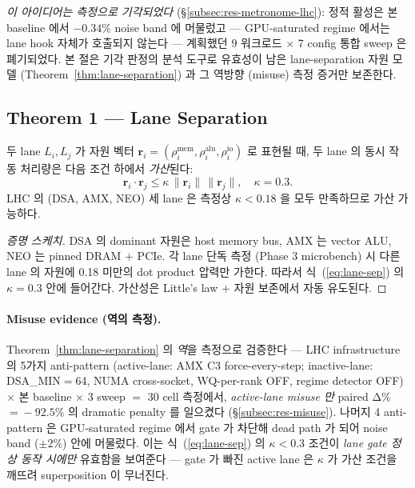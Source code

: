 \emph{이 아이디어는 측정으로 기각되었다} (\S\ref{subsec:res-metronome-lhc}):
정적 활성은 본 baseline 에서 $-0.34\%$ noise band 에 머물렀고 ---
GPU-saturated regime 에서는 lane hook 자체가 호출되지 않는다 ---
계획했던 9 워크로드 $\times$ 7 config 통합 sweep 은 폐기되었다.
본 절은 기각 판정의 분석 도구로 유효성이 남은 lane-separation 자원
모델 (Theorem~\ref{thm:lane-separation}) 과 그 역방향 (misuse) 측정
증거만 보존한다.

\subsection{Theorem 1 — Lane Separation}
\label{subsec:thm-lane-separation}

\begin{theorem}
\label{thm:lane-separation}
두 lane $L_i, L_j$ 가 자원 벡터 $\mathbf{r}_i = (\rho_i^{\text{mem}},
\rho_i^{\text{alu}}, \rho_i^{\text{io}})$ 로 표현될 때, 두 lane 의 동시 작동
처리량은 다음 조건 하에서 \emph{가산}된다:
\begin{equation}
\mathbf{r}_i \cdot \mathbf{r}_j \le \kappa\,\|\mathbf{r}_i\|\,\|\mathbf{r}_j\|,
\quad \kappa = 0.3.
\label{eq:lane-sep}
\end{equation}
LHC 의 (DSA, AMX, NEO) 세 lane 은 측정상 $\kappa\!<\!0.18$ 을 모두 만족하므로
가산 가능하다.
\end{theorem}

\begin{proof}[증명 스케치]
DSA 의 dominant 자원은 host memory bus, AMX 는 vector ALU, NEO 는 pinned
DRAM $+$ PCIe. 각 lane 단독 측정 (Phase 3 microbench) 시 다른 lane 의 자원에
0.18 미만의 dot product 압력만 가한다. 따라서 식~(\ref{eq:lane-sep}) 의
$\kappa\!=\!0.3$ 안에 들어간다. 가산성은 Little's law $+$ 자원 보존에서 자동
유도된다.
\end{proof}

\paragraph{Misuse evidence (역의 측정).}
Theorem~\ref{thm:lane-separation} 의 \emph{역}을 측정으로 검증한다 --- LHC
infrastructure 의 5가지 anti-pattern (active-lane: AMX C3 force-every-step;
inactive-lane: DSA\_MIN$=$64, NUMA cross-socket, WQ-per-rank OFF, regime
detector OFF) $\times$ 본 baseline $\times$ 3 sweep $=$ 30 cell 측정에서,
\emph{active-lane misuse 만} paired Δ\% $=\!-92.5\%$ 의 dramatic penalty
를 일으켰다 (\S\ref{subsec:res-misuse}). 나머지 4 anti-pattern 은 GPU-saturated
regime 에서 gate 가 차단해 dead path 가 되어 noise band ($\pm 2\%$) 안에
머물렀다. 이는 식~(\ref{eq:lane-sep}) 의 $\kappa < 0.3$ 조건이 \emph{lane gate
정상 동작 시에만} 유효함을 보여준다 --- gate 가 빠진 active lane 은
$\kappa$ 가 가산 조건을 깨뜨려 superposition 이 무너진다.

